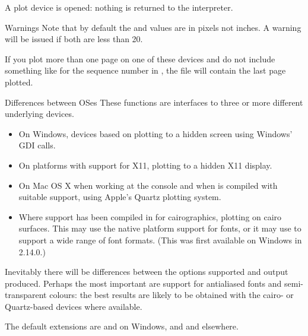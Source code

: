 %
\begin{Value}
A plot device is opened: nothing is returned to the \R{} interpreter.
\end{Value}
%
\begin{Section}{Warnings}
Note that by default the  and  values are in
pixels not inches.  A warning will be issued if both are less than 20.

If you plot more than one page on one of these devices and do not
include something like  for the sequence number in
, the file will contain the last page plotted.
\end{Section}
%
\begin{Section}{Differences between OSes}
These functions are interfaces to three or more different underlying
devices.
\begin{itemize}

\item On Windows, devices based on plotting to a hidden screen using
Windows' GDI calls.

\item On platforms with support for X11, plotting to a hidden X11
display.

\item On Mac OS X when working at the console and when \R{} is
compiled with suitable support, using Apple's Quartz plotting
system.

\item Where support has been compiled in for cairographics, plotting
on cairo surfaces.  This may use the native platform support for
fonts, or it may use  to support a wide range of
font formats.  (This was first available on Windows in \R{} 2.14.0.)

\end{itemize}

Inevitably there will be differences between the options supported and
output produced.  Perhaps the most important are support for
antialiased fonts and semi-transparent colours: the best results are
likely to be obtained with the cairo- or Quartz-based devices where
available.

The default extensions are  and  on Windows, and
 and  elsewhere.
\end{Section}
%
